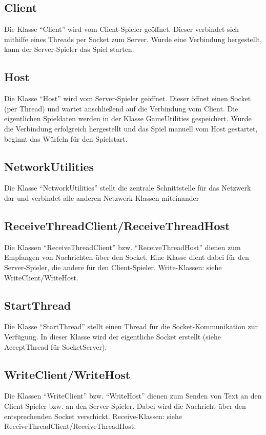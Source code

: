 \documentclass[11pt]{article} %
\begin{document}
\subsection{Client}
Die Klasse \enquote{Client} wird vom Client-Spieler geöffnet. Dieser verbindet sich mithilfe eines Threads per Socket zum Server. Wurde eine Verbindung hergestellt, kann der Server-Spieler das Spiel starten.

\subsection{Host}
Die Klasse \enquote{Host} wird vom Server-Spieler geöffnet. Dieser öffnet einen Socket (per Thread) und wartet anschließend auf die Verbindung vom Client. Die eigentlichen Spieldaten werden in der Klasse GameUtilities gespeichert.
Wurde die Verbindung erfolgreich hergestellt und das Spiel manuell vom Host gestartet, beginnt das Würfeln für den Spielstart.

\subsection{NetworkUtilities}
Die Klasse \enquote{NetworkUtilities} stellt die zentrale Schnittstelle für das Netzwerk dar und verbindet alle anderen Netzwerk-Klassen miteinander 

\subsection{ReceiveThreadClient/ReceiveThreadHost}
Die Klassen \enquote{ReceiveThreadClient} bzw. \enquote{ReceiveThreadHost} dienen zum Empfangen von Nachrichten über den Socket. Eine Klasse dient dabei für den Server-Spieler, die andere für den Client-Spieler. Write-Klassen: siehe WriteClient/WriteHost. 

\subsection{StartThread}
Die Klasse \enquote{StartThread} stellt einen Thread für die Socket-Kommunikation zur Verfügung. In dieser Klasse wird der eigentliche Socket erstellt (siehe AcceptThread für SocketServer).

\subsection{WriteClient/WriteHost}
Die Klassen \enquote{WriteClient} bzw. \enquote{WriteHost} dienen zum Senden von Text an den Client-Spieler bzw. an den Server-Spieler. Dabei wird die Nachricht über den entsprechenden Socket verschickt. Receive-Klassen: siehe ReceiveThreadClient/ReceiveThreadHost.
\end{document}
